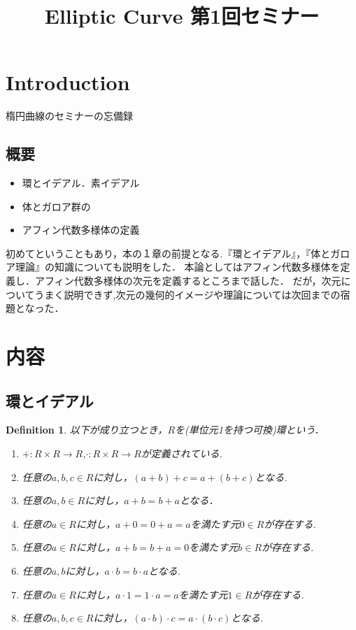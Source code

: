 \documentclass{ujarticle}
\title{Elliptic Curve 第1回セミナー}
\newtheorem{dfn}[thm]{Definition}
\begin{document}
\maketitle



\section{Introduction}
\label{sec:Introduction}
楕円曲線のセミナーの忘備録
\subsection{概要}
\label{sub:概要}
\begin{itemize}
  \setlength{\parskip}{0cm} %
  \setlength{\itemsep}{0cm} %
  \item 環とイデアル．素イデアル
  \item 体とガロア群の
  \item アフィン代数多様体の定義
\end{itemize}

初めてということもあり，本の１章の前提となる.『環とイデアル』，『体とガロア理論』の知識についても説明をした．
本論としてはアフィン代数多様体を定義し．アフィン代数多様体の次元を定義するところまで話した．
だが，次元についてうまく説明できず,次元の幾何的イメージや理論については次回までの宿題となった．


\section{内容}
\label{sec:内容}






\subsection{環とイデアル}
\label{subs:環とイデアル}
\begin{dfn}
 以下が成り立つとき，$R$を(単位元1を持つ可換)環という．
 \begin{enumerate}
   \setlength{\parskip}{0cm} %
   \setlength{\itemsep}{0cm} %
   \item $+:R \times R \to R$,$\cdot:R \times R \to R $が定義されている.
   \item 任意の$a,b,c \in R$に対し，$(a + b) +c =a +(b +c)$となる.
   \item 任意の$a,b \in R$に対し，$a + b = b + a$となる．
   \item 任意の$a \in R$に対し，$a + 0 =  0 + a = a$を満たす元$0 \in R$が存在する.
   \item 任意の$a \in R$に対し，$a + b = b + a =0$を満たす元$b \in R $が存在する.
   \item 任意の$a,b$に対し，$a \cdot b = b \cdot a$となる.
   \item 任意の$a \in R$に対し，$a \cdot 1 = 1 \cdot a =a$を満たす元$1 \in R$が存在する.
   \item 任意の$a,b,c \in R$に対し，$(a \cdot b) \cdot c =a \cdot (b \cdot c)$となる.
 \end{enumerate}
\end{dfn}
\end{document}

